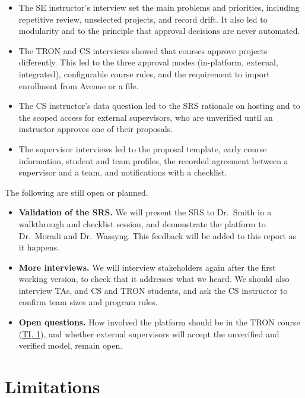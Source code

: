 \documentclass{article}
\newcommand{\intlink}[3]{\hyperref[int:#1-#2]{#3}}
\newcommand{\intref}[2]{\intlink{#1}{#2}{#1, #2}}
\begin{document}
    \begin{itemize}
        \item The SE instructor's interview set the main problems and priorities, including repetitive review,
        unselected projects, and record drift. It also led to modularity and to the principle that
        approval decisions are never automated.
        \item The TRON and CS interviews showed that courses approve projects differently. This led to the three
        approval modes (in-platform, external, integrated), configurable course rules, and the
        requirement to import enrollment from Avenue or a file.
        \item The CS instructor's data question led to the SRS rationale on hosting and to the scoped access
        for external supervisors, who are unverified until an instructor approves one of their proposals.
        \item The supervisor interviews led to the proposal template, early course information, student and
        team profiles, the recorded agreement between a supervisor and a team, and notifications with a checklist.
    \end{itemize}

    The following are still open or planned.

    \begin{itemize}
        \item \textbf{Validation of the SRS.} We will present the SRS to Dr.~Smith in a walkthrough and
        checklist session, and demonstrate the platform to Dr.~Moradi and Dr.~Wassyng. This feedback will be
        added to this report as it happens.
        \item \textbf{More interviews.} We will interview stakeholders again after the first working version,
        to check that it addresses what we heard. We should also interview TAs, and CS and TRON students,
        and ask the CS instructor to confirm team sizes and program rules.
        \item \textbf{Open questions.} How involved the platform should be in the TRON course (\intref{TI}{1}),
        and whether external supervisors will accept the unverified and verified model, remain open.
    \end{itemize}

    \section{Limitations}
    \label{sec:limits}
\end{document}
